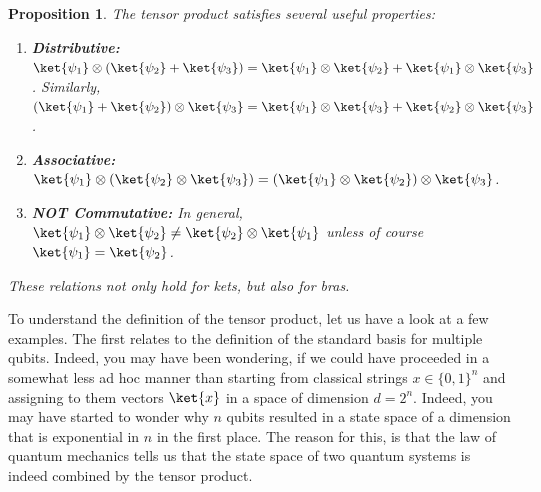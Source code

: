 \documentclass[12pt, oneside]{book}
\newtheorem{proposition}[theorem]{Proposition}
\theoremstyle{definition}
\theoremstyle{definition}
\theoremstyle{remark}
\begin{document}
\begin{proposition}
    The tensor product satisfies several useful properties:
    \begin{enumerate}
        \item \textbf{Distributive: }$\ket{\psi_1}\otimes (\ket{\psi_2}+\ket{\psi_3})=\ket{\psi_1}\otimes \ket{\psi_2}+\ket{\psi_1}\otimes \ket{\psi_3}$. Similarly, $(\ket{\psi_1}+\ket{\psi_2})\otimes \ket{\psi_3}=\ket{\psi_1}\otimes \ket{\psi_3}+\ket{\psi_2}\otimes \ket{\psi_3}$.
        \item \textbf{Associative: }$\ket{\psi_1}\otimes (\ket{\psi_2}\otimes \ket{\psi_3})=(\ket{\psi_1}\otimes \ket{\psi_2})\otimes \ket{\psi_3}$.
        \item \textbf{NOT Commutative: }In general, $\ket{\psi_1}\otimes \ket{\psi_2} \neq \ket{\psi_2} \otimes \ket{\psi_1}$ unless of course $\ket{\psi_1}=\ket{\psi_2}$.
    \end{enumerate}
    These relations not only hold for kets, but also for bras.
\end{proposition}
To understand the definition of the tensor product, let us have a look at a few examples. The
first relates to the definition of the standard basis for multiple qubits. Indeed, you may have been
wondering, if we could have proceeded in a somewhat less ad hoc manner than starting from
classical strings $x \in \{0,1\}^n$ and assigning to them vectors $\ket{x}$ in a space of dimension $d = 2^n$.
Indeed, you may have started to wonder why $n$ qubits resulted in a state space of a dimension that
is exponential in $n$ in the first place. The reason for this, is that the law of quantum mechanics tells
us that the state space of two quantum systems is indeed combined by the tensor product.
\end{document}
